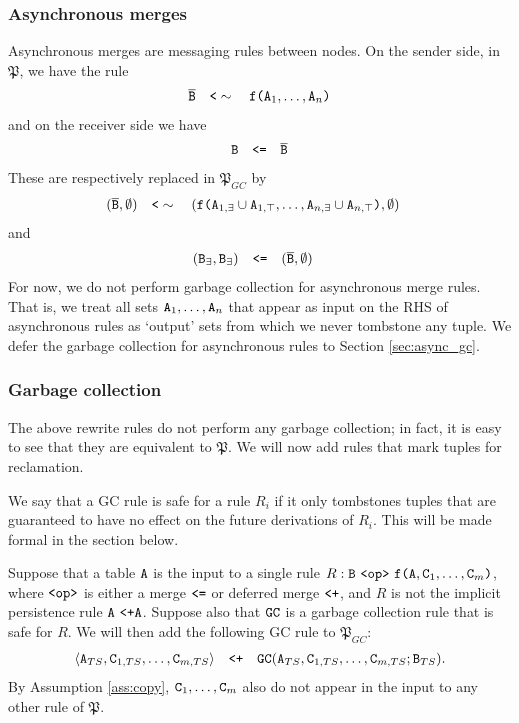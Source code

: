 \subsubsection{Asynchronous merges}
Asynchronous merges are messaging rules between nodes.
On the sender side, in $\mathfrak{P}$, we have the rule 
\begin{align}
\overline{\tt{B}} \quad\tt{<}\sim\quad \tt{f(}\tt{A}_1,\dots,\tt{A}_n\tt{)}
\end{align}
and on the receiver side we have
\begin{align}
\tt{B} \quad\tt{<=}\quad \overline{\tt{B}}
\end{align}
These are respectively replaced in $\mathfrak{P}_{GC}$ by
\begin{align}
(\overline{\tt{B}}, \emptyset) &\quad\tt{<}\sim\quad (\tt{f(}\tt{A}_{1,\exists} \cup \tt{A}_{1,\top},\dots,\tt{A}_{n,\exists} \cup \tt{A}_{n,\top}\tt{)}, \emptyset)
\end{align}
and
\begin{align}
(\tt{B}_\exists, \tt{B}_\exists) &\quad\tt{<=}\quad (\overline{\tt{B}}, \emptyset)
\end{align}
For now, we do not perform garbage collection for asynchronous merge rules.
That is, we treat all sets $\tt{A}_1, \dots, \tt{A}_n$ that appear as input on the RHS of asynchronous rules as `output' sets from which we never tombstone any tuple.
We defer the garbage collection for asynchronous rules to Section \ref{sec:async_gc}.

\subsubsection{Garbage collection}
The above rewrite rules do not perform any garbage collection; in fact, it is easy to see that they are equivalent to $\mathfrak{P}$.
We will now add rules that mark tuples for reclamation.

We say that a GC rule is safe for a rule $R_i$ if it only tombstones tuples that are guaranteed to have no effect on the future derivations of $R_i$.
This will be made formal in the section below.

Suppose that a table $\tt{A}$ is the input to a single rule $R: \tt{B} ~\tt{<op>}~ \tt{f}\tt{(}\tt{A},\tt{C}_1,\dots,\tt{C}_m\tt{)}$, where $\tt{<op>}$ is either a merge $\tt{<=}$ or deferred merge $\tt{<+}$, and $R$ is not the implicit persistence rule $\tt{A} ~\tt{<+} \tt{A}$.
Suppose also that $\tt{GC}$ is a garbage collection rule that is safe for $R$.
We will then add the following GC rule to $\mathfrak{P}_{GC}$:
\begin{align}
\langle \tt{A}_{TS}, \tt{C}_{1,TS}, \dots, \tt{C}_{m,TS} \rangle
\quad\tt{<+}\quad
\tt{GC}(\tt{A}_{TS}, \tt{C}_{1,TS}, \dots, \tt{C}_{m,TS}; \tt{B}_{TS}).
\end{align}
By Assumption \ref{ass:copy}, $\tt{C}_1,\dots,\tt{C}_m$ also do not appear in the input to any other rule of $\mathfrak{P}$.

